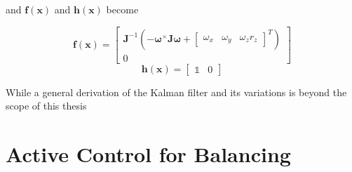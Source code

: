and $\bm{f}(\bm{x})$ and $\bm{h}(\bm{x})$ become

\begin{equation}
    \bm{f}(\bm{x}) = \begin{bmatrix}
        \bm{J}^{-1}(-\bm{\omega}^\times \bm{J\omega} + \begin{bmatrix} \omega_x & \omega_y & \omega_z r_z \end{bmatrix}^T)
        \\
        0
    \end{bmatrix}    
\end{equation}
\begin{equation}
    \bm{h}(\bm{x})= \begin{bmatrix}
        \mathbb{1} & 0
    \end{bmatrix}
\end{equation}

While a general derivation of the Kalman filter and its variations is beyond the scope of this thesis 
\section{Active Control for Balancing}

